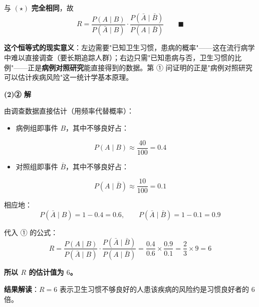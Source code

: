 \begin{answer}
与 $(\star)$ \textbf{完全相同}，故
\nopagebreak[4]
\[R=\frac{P(A\mid B)}{P(\bar A\mid B)}\cdot\frac{P(\bar A\mid\bar B)}{P(A\mid\bar B)}\qquad\blacksquare\]

\begin{gktip}
\textbf{这个恒等式的现实意义}：左边需要"已知卫生习惯，患病的概率"——这在流行病学中难以直接调查（要长期追踪人群）；右边只需"已知患病与否，卫生习惯的比例"——正是\textbf{病例对照研究}能直接得到的数据。第 ① 问证明的正是"病例对照研究可以估计疾病风险"这一统计学基本原理。
\end{gktip}

\par\medskip

\textbf{(2)② 解}

由调查数据直接估计（用频率代替概率）：

\begin{itemize}
\item 病例组即事件 $B$，其中不够良好占：
\end{itemize}
\nopagebreak[4]
\[P(A\mid B)\approx\frac{40}{100}=0.4\]

\begin{itemize}
\item 对照组即事件 $\bar B$，其中不够良好占：
\end{itemize}
\nopagebreak[4]
\[P(A\mid\bar B)\approx\frac{10}{100}=0.1\]

相应地：
\nopagebreak[4]
\[P(\bar A\mid B)=1-0.4=0.6,\qquad P(\bar A\mid\bar B)=1-0.1=0.9\]

代入 ① 的公式：
\nopagebreak[4]
\[R=\frac{P(A\mid B)}{P(\bar A\mid B)}\cdot\frac{P(\bar A\mid\bar B)}{P(A\mid\bar B)}=\frac{0.4}{0.6}\times\frac{0.9}{0.1}=\frac23\times9=6\]

\textbf{所以 $R$ 的估计值为 $6$。}

\begin{gktip}
\textbf{结果解读}：$R=6$ 表示卫生习惯不够良好的人患该疾病的风险约是习惯良好者的 $6$ 倍。
\end{gktip}



\par\medskip

\end{answer}
